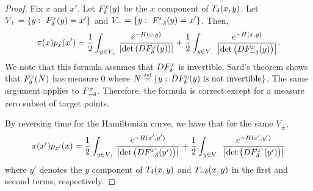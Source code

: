 \begin{proof}
Fix $x$ and $x'$. Let $F^{x}_{\delta}(y)$ be the $x$ component
of $T_{\delta}(x,y)$. Let $V_{+}=\{y:\text{ }F^{x}_{\delta}(y)=x'\}$
and $V_{-}=\{y:\text{ }F^{x}_{-\delta}(y)=x'\}$. Then, 
\[
\pi(x)p_{x}(x')=\frac{1}{2}\int_{y\in V_{+}}\frac{e^{-H(x,y)}}{\left|\det\left(DF^{x}_{\delta}(y)\right)\right|}+\frac{1}{2}\int_{y\in V_{-}}\frac{e^{-H(x,y)}}{\left|\det\left(DF^{x}_{-\delta}(y)\right)\right|}.
\]
We note that this formula assumes that $DF^{x}_{\delta}$ is invertible.
Sard's theorem shows that $F^{x}_{\delta}(N)$ has measure $0$ where
$N\stackrel{\mathrm{{\scriptscriptstyle def}}}{=}\{y:\,DF^{x}_{\delta}(y)\text{ is not invertible}\}$. The
same argument applies to $F^{x}_{-\delta}$. Therefore, the formula
is correct except for a measure zero subset of target points.

By reversing time for the Hamiltonian curve, we have that for the
same $V_{\pm}$, 
\begin{equation}
\pi(x')p_{x'}(x)=\frac{1}{2}\int_{y\in V_{+}}\frac{e^{-H(x',y')}}{\left|\det\left(DF^{x'}_{-\delta}(y')\right)\right|}+\frac{1}{2}\int_{y\in V_{-}}\frac{e^{-H(x',y')}}{\left|\det\left(DF^{x'}_{\delta}(y')\right)\right|}\label{eq:ham_transit}
\end{equation}
where $y'$ denotes the $y$ component of $T_{\delta}(x,y)$ and $T_{-\delta}(x,y)$
in the first and second terms, respectively.


\end{proof}
